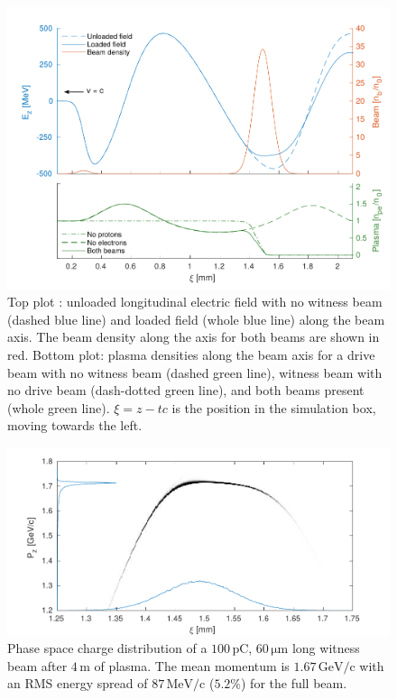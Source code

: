 \documentclass[aps,prstab,reprint,amsmath,amssymb,groupedaddress]{revtex4-1}
\newcommand{\unit}[1]{\,\mathrm{#1}}
\begin{document}
\begin{figure}[hbt]
    \includegraphics[width=\linewidth,trim={2mm 0mm 2mm 0mm},clip]{figures/beamLoading}
    \caption{\label{Fig:BeamLoading} Top plot%
    : unloaded longitudinal electric field with no witness beam (dashed blue line) and %
        loaded field (whole blue line) along the beam axis. The beam density along the axis for both beams are shown in
        red. %
        Bottom plot: plasma densities along the beam axis for a drive beam with no witness beam (dashed green line),
        witness beam with no drive beam (dash-dotted green line), and both beams present (whole green line).
        $\xi = z - tc$ is the position in the simulation box, moving towards the left.}
\end{figure}

\begin{figure}[hbt]
    \includegraphics[width=\linewidth,trim={2mm 0mm 2mm 0mm},clip]{figures/beamPhaseSpace}
    \caption{\label{Fig:BeamPS} %
        Phase space charge distribution of a $100\unit{pC}$, $60\unit{\mu m}$ long witness beam after $4\unit{m}$ of
        plasma. The mean momentum is $1.67\unit{GeV/c}$ with an RMS energy spread of $87\unit{MeV/c}$ ($5.2\%$) for the
        full beam.}
\end{figure}
\end{document}
